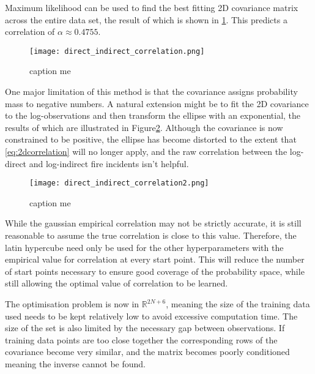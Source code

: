 \documentclass[a4paper,11pt]{report}
\begin{document}
Maximum likelihood can be used to find the best fitting 2D covariance matrix across the entire data set, the result of which is shown in \ref{fig:correlation}. This predicts a correlation of \(\alpha \approx 0.4755\).

\begin{figure}
\centering
\texttt{[image: direct\_indirect\_correlation.png]}
\caption{caption me}
\label{fig:correlation}
\end{figure}


One major limitation of this method is that the covariance assigns probability mass to negative numbers. A natural extension might be to fit the 2D covariance to the log-observations and then transform the ellipse with an exponential, the results of which are illustrated in Figure\ref{fig:lcorrelation}. Although the covariance is now constrained to be positive, the ellipse has become distorted to the extent that \ref{eq:2dcorrelation} will no longer apply, and the raw correlation between the log-direct and log-indirect fire incidents isn't helpful.

\begin{figure}
\centering
\texttt{[image: direct\_indirect\_correlation2.png]}
\caption{caption me}
\label{fig:lcorrelation}
\end{figure}

While the gaussian empirical correlation may not be strictly accurate, it is still reasonable to assume the true correlation is close to this value. Therefore, the latin hypercube need only be used for the other hyperparameters with the empirical value for correlation at every start point. This will reduce the number of start points necessary to ensure good coverage of the probability space, while still allowing the optimal value of correlation to be learned.


The optimisation problem is now in \(\mathds{R}^{2N+6}\), meaning the size of the training data used needs to be kept relatively low to avoid excessive computation time. The size of the set is also limited by the necessary gap between observations. If training data points are too close together the corresponding rows of the covariance become very similar, and the matrix becomes poorly conditioned meaning the inverse cannot be found. \par
\end{document}

